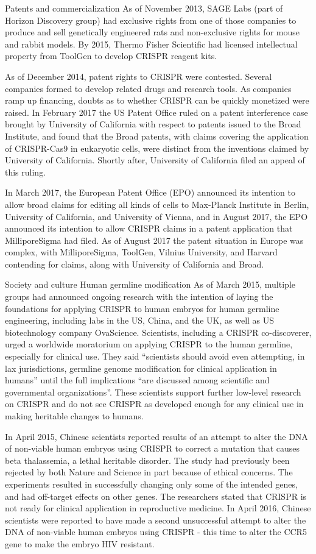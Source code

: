 Patents and commercialization
As of November 2013, SAGE Labs (part of Horizon Discovery group) had exclusive rights from one of those companies to produce and sell genetically engineered rats and non-exclusive rights for mouse and rabbit models. By 2015, Thermo Fisher Scientific had licensed intellectual property from ToolGen to develop CRISPR reagent kits.

As of December 2014, patent rights to CRISPR were contested. Several companies formed to develop related drugs and research tools. As companies ramp up financing, doubts as to whether CRISPR can be quickly monetized were raised. In February 2017 the US Patent Office ruled on a patent interference case brought by University of California with respect to patents issued to the Broad Institute, and found that the Broad patents, with claims covering the application of CRISPR-Cas9 in eukaryotic cells, were distinct from the inventions claimed by University of California. Shortly after, University of California filed an appeal of this ruling.

In March 2017, the European Patent Office (EPO) announced its intention to allow broad claims for editing all kinds of cells to Max-Planck Institute in Berlin, University of California, and University of Vienna, and in August 2017, the EPO announced its intention to allow CRISPR claims in a patent application that MilliporeSigma had filed. As of August 2017 the patent situation in Europe was complex, with MilliporeSigma, ToolGen, Vilnius University, and Harvard contending for claims, along with University of California and Broad.

Society and culture
Human germline modification
As of March 2015, multiple groups had announced ongoing research with the intention of laying the foundations for applying CRISPR to human embryos for human germline engineering, including labs in the US, China, and the UK, as well as US biotechnology company OvaScience. Scientists, including a CRISPR co-discoverer, urged a worldwide moratorium on applying CRISPR to the human germline, especially for clinical use. They said ``scientists should avoid even attempting, in lax jurisdictions, germline genome modification for clinical application in humans'' until the full implications ``are discussed among scientific and governmental organizations''. These scientists support further low-level research on CRISPR and do not see CRISPR as developed enough for any clinical use in making heritable changes to humans.

In April 2015, Chinese scientists reported results of an attempt to alter the DNA of non-viable human embryos using CRISPR to correct a mutation that causes beta thalassemia, a lethal heritable disorder. The study had previously been rejected by both Nature and Science in part because of ethical concerns. The experiments resulted in successfully changing only some of the intended genes, and had off-target effects on other genes. The researchers stated that CRISPR is not ready for clinical application in reproductive medicine. In April 2016, Chinese scientists were reported to have made a second unsuccessful attempt to alter the DNA of non-viable human embryos using CRISPR - this time to alter the CCR5 gene to make the embryo HIV resistant.

